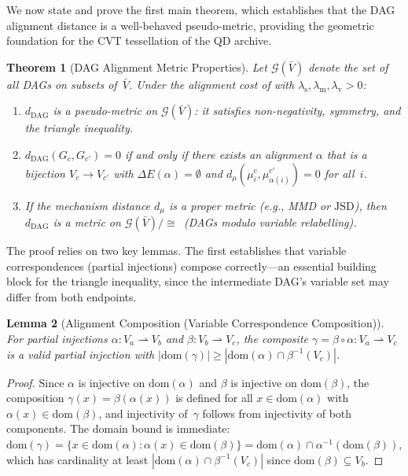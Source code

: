 \documentclass[11pt,a4paper]{article}
\newtheorem{theorem}{Theorem}[section]
\newtheorem{lemma}[theorem]{Lemma}
\theoremstyle{definition}
\newcommand{\Vbar}{\bar{V}}                   %
\newcommand{\Dom}{\mathrm{dom}}               %
\newcommand{\JSD}{\mathrm{JSD}}               %
\newcommand{\dDAG}{d_{\mathrm{DAG}}}          %
\newcommand{\dmu}{d_{\mu}}                    %
\begin{document}
We now state and prove the first main theorem, which establishes that the
DAG alignment distance is a well-behaved pseudo-metric, providing the
geometric foundation for the CVT tessellation of the QD archive.

\begin{theorem}[DAG Alignment Metric Properties]\label{thm:dag-metric}
Let $\mathcal{G}(\Vbar)$ denote the set of all DAGs on subsets of~$\Vbar$.
Under the alignment cost of  with
$\lambda_{\mathrm{s}}, \lambda_{\mathrm{m}}, \lambda_{\mathrm{v}} > 0$:
\begin{enumerate}[label=(\alph*)]
  \item $\dDAG$ is a pseudo-metric on $\mathcal{G}(\Vbar)$: it satisfies
        non-negativity, symmetry, and the triangle inequality.

  \item $\dDAG(G_c, G_{c'}) = 0$ if and only if there exists an alignment
        $\alpha$ that is a bijection $V_c \to V_{c'}$ with
        $\Delta E(\alpha) = \emptyset$ and
        $\dmu(\mu_i^c, \mu_{\alpha(i)}^{c'}) = 0$ for all~$i$.

  \item If the mechanism distance $\dmu$ is a proper metric (e.g., MMD or
        $\JSD$), then $\dDAG$ is a metric on
        $\mathcal{G}(\Vbar) / {\cong}$\, (DAGs modulo variable
        relabelling).
\end{enumerate}
\end{theorem}

The proof relies on two key lemmas.  The first establishes that variable
correspondences (partial injections) compose correctly---an essential
building block for the triangle inequality, since the intermediate DAG's
variable set may differ from both endpoints.

\begin{lemma}[Alignment Composition (Variable Correspondence Composition)]\label{lem:composition}
For partial injections $\alpha \colon V_a \rightharpoonup V_b$ and
$\beta \colon V_b \rightharpoonup V_c$, the composite
$\gamma = \beta \circ \alpha \colon V_a \rightharpoonup V_c$ is a valid
partial injection with
$|\Dom(\gamma)| \ge |\Dom(\alpha) \cap \beta^{-1}(V_c)|$.
\end{lemma}

\begin{proof}
Since $\alpha$ is injective on $\Dom(\alpha)$ and $\beta$ is injective on
$\Dom(\beta)$, the composition $\gamma(x) = \beta(\alpha(x))$ is defined
for all $x \in \Dom(\alpha)$ with $\alpha(x) \in \Dom(\beta)$, and
injectivity of~$\gamma$ follows from injectivity of both components.
The domain bound is immediate: $\Dom(\gamma) = \{x \in \Dom(\alpha) :
\alpha(x) \in \Dom(\beta)\} = \Dom(\alpha) \cap \alpha^{-1}(\Dom(\beta))$,
which has cardinality at least $|\Dom(\alpha) \cap \beta^{-1}(V_c)|$ since
$\Dom(\beta) \subseteq V_b$.
\end{proof}
\end{document}
